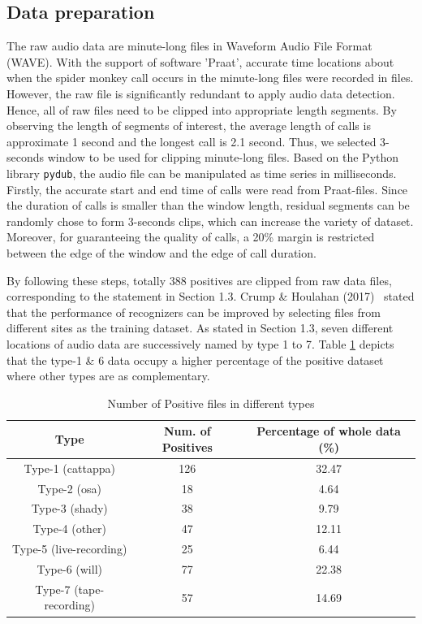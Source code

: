 \subsection{Data preparation}
The raw audio data are minute-long files in Waveform Audio File Format (WAVE). With the support of software 'Praat', accurate time locations about when the spider monkey call occurs in the minute-long files were recorded in files. However, the raw file is significantly redundant to apply audio data detection. Hence, all of raw files need to be clipped into appropriate length segments. By observing the length of segments of interest, the average length of calls is approximate 1 second and the longest call is 2.1 second. Thus, we selected 3-seconds window to be used for clipping minute-long files. Based on the Python library \texttt{pydub}, the audio file can be manipulated as time series in milliseconds. Firstly, the accurate start and end time of calls were read from Praat-files. Since the duration of calls is smaller than the window length, residual segments can be randomly chose to form 3-seconds clips, which can increase the variety of dataset. Moreover, for guaranteeing the quality of calls, a 20\% margin is restricted between the edge of the window and the edge of call duration. \par
By following these steps, totally 388 positives are clipped from raw data files, corresponding to the statement in Section 1.3. Crump \& Houlahan (2017)~\cite{crump2017designing} stated that the performance of recognizers can be improved by selecting files from different sites as the training dataset. As stated in Section 1.3, seven different locations of audio data are successively named by type 1 to 7. Table \ref{tabel:Positives} depicts that the type-1 \& 6 data occupy a higher percentage of the positive dataset where other types are as complementary.
\begin{table}[h]
\begin{center}
\caption{Number of Positive files in different types}
\label{tabel:Positives}
\begin{tabular}{ | c | c| c | } 
\hline
Type & Num. of Positives & Percentage of whole data (\%) \\ 
\hline
Type-1 (cattappa) & 126 & 32.47 \\ 
Type-2 (osa) & 18 & 4.64 \\ 
Type-3 (shady) & 38 & 9.79 \\ 
Type-4 (other) & 47 & 12.11 \\ 
Type-5 (live-recording) & 25 & 6.44 \\ 
Type-6 (will) & 77 & 22.38 \\ 
Type-7 (tape-recording) & 57 & 14.69 \\ 
\hline
\end{tabular}
\end{center} 
\end{table}\par
